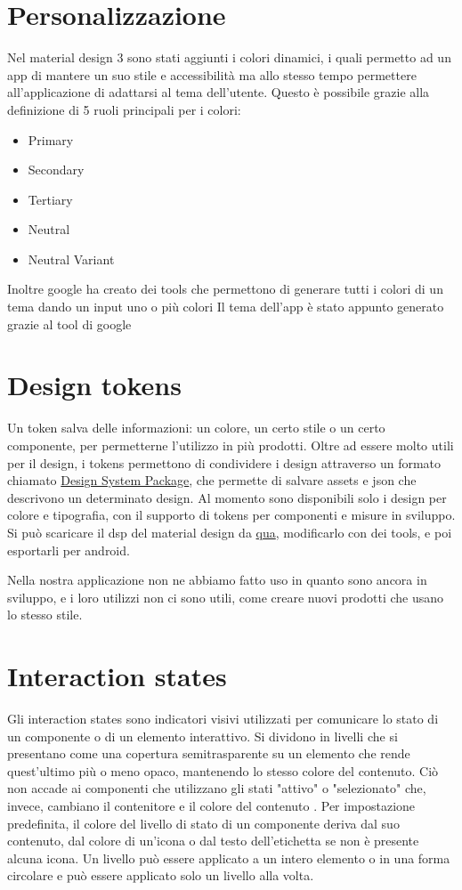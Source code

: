 \documentclass[12pt, a4paper]{report}
\begin{document}
	\section{Personalizzazione}
		Nel material design 3 sono stati aggiunti i colori dinamici, i quali permetto ad un app di mantere un suo stile e accessibilità ma allo stesso tempo permettere all'applicazione di adattarsi al tema dell'utente.
		Questo è possibile grazie alla definizione di 5 ruoli principali per i colori:
		\begin{itemize}
			\item Primary
			\item Secondary
			\item Tertiary
			\item Neutral
			\item Neutral Variant
		\end{itemize}
		Inoltre google ha creato dei tools che permettono di generare tutti i colori di un tema dando un input uno o più colori
		Il tema dell'app è stato appunto generato grazie al tool di google
		
	\section{Design tokens}
		Un token salva delle informazioni: un colore, un certo stile o un certo componente, per permetterne l'utilizzo in più prodotti.
		Oltre ad essere molto utili per il design, i tokens permettono di condividere i design attraverso un formato chiamato \href{https://github.com/AdobeXD/design-system-package-dsp}{Design System Package},
		che permette di salvare assets e json che descrivono un determinato design.
		Al momento sono disponibili solo i design per colore e tipografia, con il supporto di tokens per componenti e misure in sviluppo. Si può scaricare il dsp del material design da \href{https://github.com/material-foundation/material-tokens}{qua}, modificarlo con dei tools, e poi esportarli per android.
		
		Nella nostra applicazione non ne abbiamo fatto uso in quanto sono ancora in sviluppo, e i loro utilizzi non ci sono utili, come creare nuovi prodotti che usano lo stesso stile.

	\section{Interaction states}
	Gli interaction states sono indicatori visivi utilizzati per comunicare lo stato di un componente o di un elemento interattivo. Si dividono in livelli che si presentano come una  copertura semitrasparente su un elemento che rende quest'ultimo più o meno opaco, mantenendo lo stesso colore del contenuto.
	Ciò non accade ai componenti che utilizzano gli stati "attivo" o "selezionato" che, invece, cambiano il contenitore e il colore del contenuto .
	Per impostazione predefinita, il colore del livello di stato di un componente deriva dal suo contenuto, dal colore di un'icona o dal testo dell'etichetta se non è presente alcuna icona.
	Un livello può essere applicato a un intero elemento o in una forma circolare e può essere applicato solo un livello alla volta.
\end{document}
